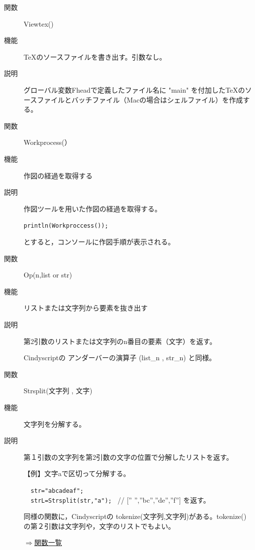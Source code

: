 \documentclass[papersize,a4paper,12pt,uplatex]{jsarticle}
\begin{document}
\begin{description}
\vspace{\baselineskip}
\hypertarget{viewtex}{}
\item[関数]  Viewtex()
\item[機能]  \TeX のソースファイルを書き出す。引数なし。
\item[説明]  グローバル変数Fheadで定義したファイル名に "main" を付加した\TeX のソースファイルとバッチファイル（Macの場合はシェルファイル）を作成する。
 
\vspace{\baselineskip}
\hypertarget{workprocess}{}
\item[関数]  Workprocess(）
\item[機能]  作図の経過を取得する
\item[説明]  作図ツールを用いた作図の経過を取得する。

\verb|println(Workproccess());|
  
  とすると，コンソールに作図手順が表示される。

\vspace{\baselineskip}
\hypertarget{op}{}
\item[関数]  Op(n,list or str)
\item[機能]  リストまたは文字列から要素を抜き出す
\item[説明]  第2引数のリストまたは文字列のn番目の要素（文字）を返す。

Cindyscriptの アンダーバーの演算子 (list\_n , str\_n) と同様。

\vspace{\baselineskip}
\hypertarget{strsplit}{}
\item[関数]  Strsplit(文字列 , 文字)
\item[機能]  文字列を分解する。
\item[説明]  第１引数の文字列を第2引数の文字の位置で分解したリストを返す。

\vspace{\baselineskip}
【例】文字aで区切って分解する。

\verb|  str="abcadeaf";| \\
\verb|  strL=Strsplit(str,"a"); |  //  [” ”,”bc”,”de”,”f”] を返す。

同様の関数に，Cindyscriptの tokenize(文字列,文字列)がある。tokenize() の第２引数は文字列や，文字のリストでもよい。

\begin{flushright}  \hyperlink{functionlist}{$\Rightarrow$関数一覧}\end{flushright}


\end{description}
\newpage
\end{document}
